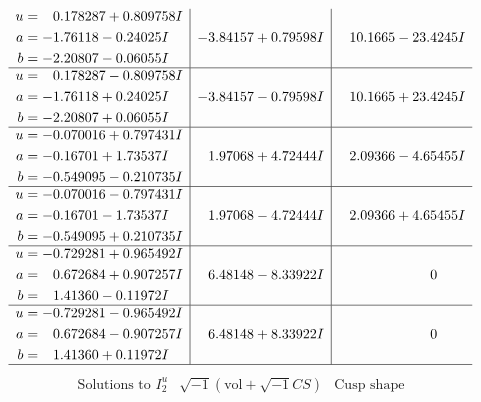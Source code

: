 \documentclass[1p]{elsarticle_modified}
\theoremstyle{definition}
\newcommand{\I}{\sqrt{-1}}
\begin{document}
$$\begin{array}{c|c|c}
\begin{aligned}
u &= \phantom{-}0.178287 + 0.809758 I \\
a &= -1.76118 - 0.24025 I \\
b &= -2.20807 - 0.06055 I\end{aligned}
 & -3.84157 + 0.79598 I & \phantom{-}10.1665 - 23.4245 I \\ \hline\begin{aligned}
u &= \phantom{-}0.178287 - 0.809758 I \\
a &= -1.76118 + 0.24025 I \\
b &= -2.20807 + 0.06055 I\end{aligned}
 & -3.84157 - 0.79598 I & \phantom{-}10.1665 + 23.4245 I \\ \hline\begin{aligned}
u &= -0.070016 + 0.797431 I \\
a &= -0.16701 + 1.73537 I \\
b &= -0.549095 - 0.210735 I\end{aligned}
 & \phantom{-}1.97068 + 4.72444 I & \phantom{-}2.09366 - 4.65455 I \\ \hline\begin{aligned}
u &= -0.070016 - 0.797431 I \\
a &= -0.16701 - 1.73537 I \\
b &= -0.549095 + 0.210735 I\end{aligned}
 & \phantom{-}1.97068 - 4.72444 I & \phantom{-}2.09366 + 4.65455 I \\ \hline\begin{aligned}
u &= -0.729281 + 0.965492 I \\
a &= \phantom{-}0.672684 + 0.907257 I \\
b &= \phantom{-}1.41360 - 0.11972 I\end{aligned}
 & \phantom{-}6.48148 - 8.33922 I & \phantom{-0.000000 } 0 \\ \hline\begin{aligned}
u &= -0.729281 - 0.965492 I \\
a &= \phantom{-}0.672684 - 0.907257 I \\
b &= \phantom{-}1.41360 + 0.11972 I\end{aligned}
 & \phantom{-}6.48148 + 8.33922 I & \phantom{-0.000000 } 0\\
 \hline 
 \end{array}$$\newpage$$\begin{array}{c|c|c}  
\text{Solutions to }I^u_{2}& \I (\text{vol} + \sqrt{-1}CS) & \text{Cusp shape}\\
 \hline 
\begin{aligned}

\end{aligned}
\end{array}$$
\end{document}
